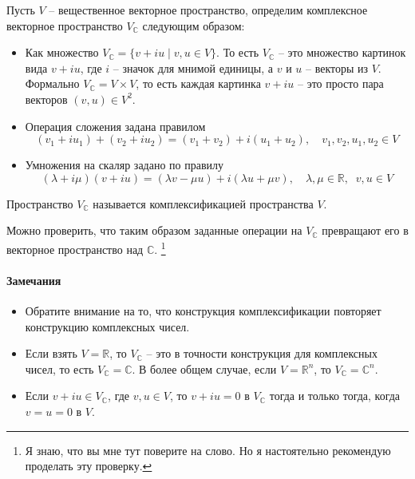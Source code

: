 \begin{definition}
Пусть $V$ -- вещественное векторное пространство, определим комплексное векторное пространство $V_{\mathbb C}$ следующим образом:
\begin{itemize}
\item Как множество $V_{\mathbb C} = \{v + i u \mid v,u\in V\}$.
То есть $V_\mathbb C$ -- это множество картинок вида $v+iu$, где $i$ -- значок для мнимой единицы, а $v$ и $u$ -- векторы из $V$.
Формально $V_\mathbb C = V\times V$, то есть каждая картинка $v+iu$ -- это просто пара векторов $(v,u)\in V^2$.

\item Операция сложения задана правилом
\[
(v_1+iu_1) + (v_2 + iu_2) = (v_1+v_2) + i(u_1+u_2),\quad v_1,v_2,u_1,u_2\in V
\]

\item Умножения на скаляр задано по правилу
\[
(\lambda + i\mu) (v+iu) = (\lambda v - \mu u) + i(\lambda u + \mu v),\quad \lambda,\mu \in \mathbb R, \;\; v,u\in V
\]
\end{itemize}
Пространство $V_\mathbb C$ называется комплексификацией пространства $V$.
\end{definition}

Можно проверить, что таким образом заданные операции на $V_\mathbb C$ превращают его в векторное пространство над $\mathbb C$.%
\footnote{Я знаю, что вы мне тут поверите на слово.
Но я настоятельно рекомендую проделать эту проверку.}

\paragraph{Замечания}

\begin{itemize}
\item Обратите внимание на то, что конструкция комплексификации повторяет конструкцию комплексных чисел.

\item Если взять $V = \mathbb R$, то $V_\mathbb C$ -- это в точности конструкция для комплексных чисел, то есть $V_\mathbb C = \mathbb C$.
В более общем случае, если $V = \mathbb R^n$, то $V_\mathbb C = \mathbb C^n$.

\item Если $v+iu\in V_\mathbb C$, где $v,u\in V$, то $v + iu = 0$ в $V_\mathbb C$ тогда и только тогда, когда $v = u = 0 $ в $V$.

\end{itemize}

